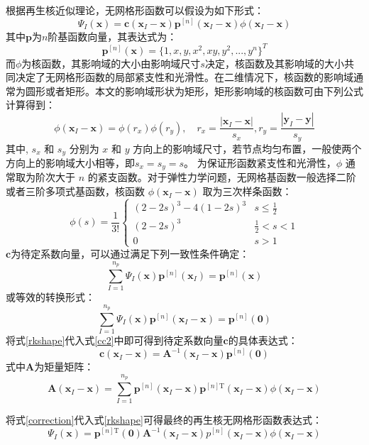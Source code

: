 根据再生核近似理论，无网格形函数可以假设为如下形式：
\begin{equation}\label{rkshape}
    \Psi_I(\boldsymbol x) = \boldsymbol c(\boldsymbol x_I-\boldsymbol x) \boldsymbol p^{[n]}(\boldsymbol x_I-\boldsymbol x) \phi(\boldsymbol x_I - \boldsymbol x)
\end{equation}
其中$\boldsymbol p$为$n$阶基函数向量，其表达式为：
\begin{equation}
    \boldsymbol p^{[n]}(\boldsymbol x) = \{ 1, x, y, x^2, xy, y^2,...,y^n\}^T
\end{equation}
而$\phi$为核函数，其影响域的大小由影响域尺寸$s$决定，核函数及其影响域的大小共同决定了无网格形函数的局部紧支性和光滑性。在二维情况下，核函数的影响域通常为圆形或者矩形。本文的影响域形状为矩形，矩形影响域的核函数可由下列公式计算得到：
\begin{equation}
    \phi(\boldsymbol x_I-\boldsymbol x) = \phi(r_x) \phi(r_y), \quad r_x = \frac{|\boldsymbol x_I - \boldsymbol x|}{s_{x}},r_y = \frac{|\boldsymbol y_I - \boldsymbol y|}{s_{y}}
\end{equation}
其中, $s_x$ 和 $s_y$ 分别为 $x$ 和 $y$ 方向上的影响域尺寸，若节点均匀布置，一般使两个方向上的影响域大小相等，即$s_x = s_y = s$。
为保证形函数紧支性和光滑性，$\phi$ 通常取为阶次大于 $n$ 的紧支函数。对于弹性力学问题，无网格基函数一般选择二阶或者三阶多项式基函数，核函数 $\phi(\boldsymbol x_I-\boldsymbol x)$ 取为三次样条函数：
\begin{equation}
    \phi(s) =\frac{1}{3!} \begin{cases}
        (2-2s)^3 - 4(1-2s)^3 & s\le\frac{1}{2} \\
        (2-2s)^3 &\frac{1}{2}<s<1 \\
        0 & s> 1
    \end{cases}
\end{equation}
$\boldsymbol c$为待定系数向量，可以通过满足下列一致性条件确定：
\begin{equation}\label{cc1}
    \sum_{I=1}^{n_p}\Psi_I(\boldsymbol x) \boldsymbol p^{[n]}(\boldsymbol x_I) = \boldsymbol p^{[n]} (\boldsymbol x)
\end{equation}
或等效的转换形式：
\begin{equation}\label{cc2}
    \sum_{I=1}^{n_p}\Psi_I(\boldsymbol x) \boldsymbol p^{[n]}(\boldsymbol x_I-\boldsymbol x) = \boldsymbol p^{[n]} (\boldsymbol 0)
\end{equation}
将式\eqref{rkshape}代入式\eqref{cc2}中即可得到待定系数向量$\boldsymbol c$的具体表达式：
\begin{equation}\label{correction}
    \boldsymbol c(\boldsymbol x_I-\boldsymbol x) = \boldsymbol A^{-1}(\boldsymbol x_I-\boldsymbol x)\boldsymbol p^{[n]}(\boldsymbol 0)
\end{equation}
式中$\boldsymbol A$为矩量矩阵：
\begin{equation}
    \boldsymbol A(\boldsymbol x_I-\boldsymbol x) = \sum_{I=1}^{n_p}\boldsymbol p^{[n]}(\boldsymbol x_I-\boldsymbol x) \boldsymbol p^{[n]\mathrm{T}}(\boldsymbol x_I-\boldsymbol x)\phi(\boldsymbol x_I-\boldsymbol x)
\end{equation}

将式\eqref{correction}代入式\eqref{rkshape}可得最终的再生核无网格形函数表达式：
\begin{equation}
    \Psi_I(\boldsymbol x) = \boldsymbol p^{[n]\mathrm{T}}(\boldsymbol 0) \boldsymbol A^{-1}(\boldsymbol x_I-\boldsymbol x)p^{[n]}(\boldsymbol x_I-\boldsymbol x)\phi(\boldsymbol x_I-\boldsymbol x)
\end{equation}